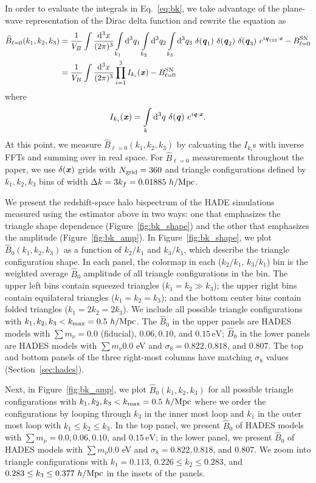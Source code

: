 \documentclass[12pt, letterpaper, preprint]{aastex62}
\newcommand{\smnu}{\sum m_\nu}
\newcommand{\sig}{\sigma_8}
\newcommand{\BOk}{\widehat{B}_0}
\newcommand{\bfi}[1]{\textbf{\textit{#1}}}
\newcommand{\beq}{\begin{equation}}
\newcommand{\eeq}{\end{equation}}
\begin{document}
In order to evaluate the integrals in Eq.~\ref{eq:bk}, we take advantage of the plane-wave 
representation of the Dirac delta function and rewrite the equation as
\begin{align} \label{eq:bk2} 
    \widehat{B}_{\ell = 0}(k_1,k_2, k_3) &= \frac{1}{V_B} \int\frac{{\rm d}^3x}{(2\pi)^3} \int\limits_{k_1}{\rm d}^3q_1 \int\limits_{k_2}{\rm d}^3q_2 \int\limits_{k_3}{\rm d}^3q_3~\delta({\bfi q_1})~\delta({\bfi q_2})~\delta({\bfi q_3})~e^{i{\bfi q_{123}}\cdot{\bfi x}} - B^{\rm SN}_{\ell = 0}\\ 
    &= \frac{1}{V_B} \int\frac{{\rm d}^3x}{(2\pi)^3}\prod\limits_{i=1}^{3} I_{k_i}({\bfi x}) - B^{\rm SN}_{\ell = 0} 
\end{align}
where 
\beq
I_{k_i}({\bfi x}) = \int\limits_k {\rm d}^3q~\delta({\bfi q})~e^{i {\bfi q}\cdot{\bfi x}}. 
\eeq
At this point, we measure $\widehat{B}_{\ell = 0}(k_1, k_2, k_3)$ by calcuating the 
$I_{k_i}$s with inverse FFTs and summing over in real space. For $\widehat{B}_{\ell = 0}$
measurements throughout the paper, we use $\delta({\bfi x})$ grids with $N_{\rm grid} = 360$ 
and triangle configurations defined by $k_1, k_2, k_3$ bins of width 
$\Delta k = 3 k_f = 0.01885~h/{\rm Mpc}$.

We present the redshift-space halo bispectrum of the HADE simulations measured using 
the estimator above in two ways: one that emphasizes the triangle shape dependence 
(Figure~\ref{fig:bk_shape}) and the other that emphasizes the amplitude 
(Figure~\ref{fig:bk_amp}). In Figure~\ref{fig:bk_shape}, we plot $\BOk(k_1, k_2, k_3)$ 
as a function of $k_2/k_1$ and $k_3/k_1$, which describe the triangle configuration shape. 
In each panel, the colormap in each ($k_2/k_1$, $k_3/k_1$) bin is the weighted average $\BOk$ amplitude 
of all triangle configurations in the bin. The upper left bins contain squeezed triangles 
($k_1 = k_2 \gg k_3$); the upper right bins contain equilateral triangles 
($k_1 = k_2 = k_3$); and the bottom center bins contain folded triangles ($k_1 = 2 k_2 = 2 k_3$). 
We include all possible triangle configurations with $k_1, k_2, k_3 < k_{\rm max} = 0.5~h/{\rm Mpc}$. 
The $\BOk$ in the upper panels are HADES models with $\smnu = 0.0$ (fiducial), $0.06, 0.10$, 
and $0.15\,\mathrm{eV}$; $\BOk$ in the lower panels are  HADES models with $\smnu 0.0$ eV and 
$\sig = 0.822, 0.818$, and $0.807$. The top and bottom panels of the three right-most 
columns have matching $\sig$ values (Section~\ref{sec:hades}).

Next, in Figure~\ref{fig:bk_amp}, we plot $\BOk(k_1, k_2, k_3)$ for all possible triangle 
configurations with $k_1, k_2, k_3 < k_{\rm max} = 0.5~h/{\rm Mpc}$ where we order the 
configurations by looping through $k_3$ in the inner most loop and $k_1$ in the outer most 
loop with $k_1 \leq k_2 \leq k_3$. In the top panel, we present $\BOk$ of HADES models 
with $\smnu = 0.0, 0.06, 0.10$, and $0.15\,\mathrm{eV}$; in the lower panel, we present 
$\BOk$ of HADES models with $\smnu 0.0$ eV and $\sig = 0.822, 0.818$, and $0.807$. We 
zoom into triangle configurations with $k_1 = 0.113$, $0.226 \leq k_2 \leq 0.283$, 
and $0.283 \leq k_3 \leq 0.377~h/{\rm Mpc}$ in the insets of the panels. 
\end{document}

